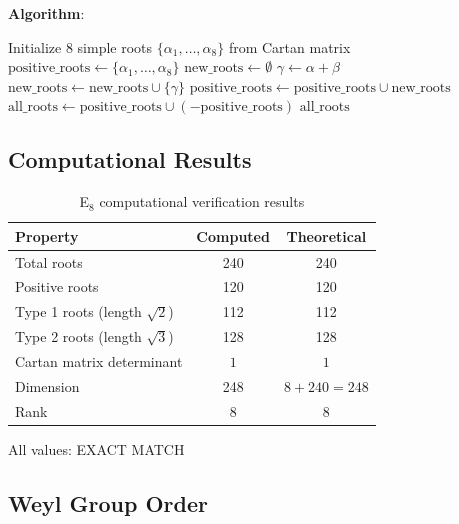 \textbf{Algorithm}:
\begin{algorithm}[H]
\caption{E$_8$ Root Generation from Cartan Matrix}
\begin{algorithmic}[1]
\State Initialize 8 simple roots $\{\alpha_1, \ldots, \alpha_8\}$ from Cartan matrix
\State $\text{positive\_roots} \gets \{\alpha_1, \ldots, \alpha_8\}$
\Repeat
    \State $\text{new\_roots} \gets \emptyset$
        \State $\gamma \gets \alpha + \beta$
            \State $\text{new\_roots} \gets \text{new\_roots} \cup \{\gamma\}$
        \EndIf
    \EndFor
    \State $\text{positive\_roots} \gets \text{positive\_roots} \cup \text{new\_roots}$
\State $\text{all\_roots} \gets \text{positive\_roots} \cup (-\text{positive\_roots})$
\State \Return $\text{all\_roots}$
\end{algorithmic}
\end{algorithm}

\subsection{Computational Results}

\begin{table}[H]
\centering
\begin{tabular}{lcc}
\toprule
\textbf{Property} & \textbf{Computed} & \textbf{Theoretical} \\
\midrule
Total roots & 240 & 240 \\
Positive roots & 120 & 120 \\
Type 1 roots (length $\sqrt{2}$) & 112 & 112 \\
Type 2 roots (length $\sqrt{3}$) & 128 & 128 \\
Cartan matrix determinant & $1$ & $1$ \\
Dimension & 248 & $8 + 240 = 248$ \\
Rank & 8 & 8 \\
\bottomrule
\end{tabular}
\caption{E$_8$ computational verification results}
\end{table}

All values: \textcolor{validcolor}{EXACT MATCH}

\subsection{Weyl Group Order}


